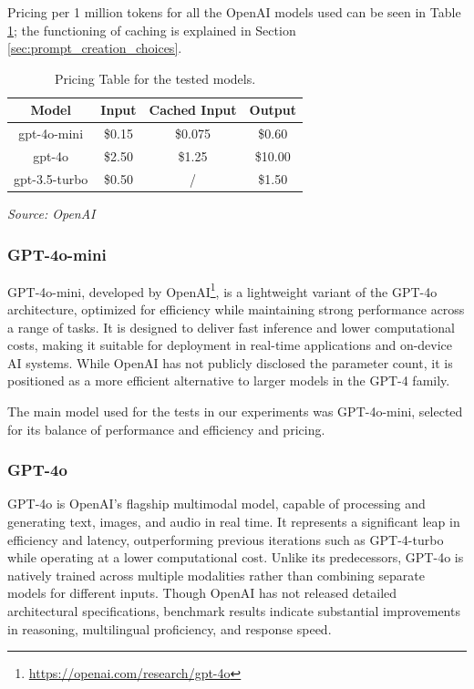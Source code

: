 Pricing per 1 million tokens for all the OpenAI models used can be seen in Table
\ref{tab:pricing}; the functioning of caching is explained in Section
\ref{sec:prompt_creation_choices}.

\vspace{3mm}
\begin{table}[h]
  \centering
  \renewcommand{\arraystretch}{1.5}
  \setlength{\tabcolsep}{8pt}
  \begin{tabular}{ c c c c }
    \textbf{Model} & \textbf{Input} & \textbf{Cached Input} & \textbf{Output} \\
    \hline
    gpt-4o-mini    & \$0.15         & \$0.075               & \$0.60          \\
    gpt-4o         & \$2.50         & \$1.25                & \$10.00         \\
    gpt-3.5-turbo  & \$0.50         & /                     & \$1.50          \\
  \end{tabular}
  \caption{Pricing Table for the tested models.}
  {\emph{Source: OpenAI \footnotemark}} \label{tab:pricing}
\end{table}
\vspace{3mm}

\subsubsection{GPT-4o-mini}
GPT-4o-mini, developed by OpenAI\footnote{\url{https://openai.com/research/gpt-4o}},
is a lightweight variant of the GPT-4o architecture, optimized for efficiency while
maintaining strong performance across a range of tasks. It is designed to
deliver fast inference and lower computational costs, making it suitable for deployment
in real-time applications and on-device AI systems. While OpenAI has not
publicly disclosed the parameter count, it is positioned as a more efficient alternative
to larger models in the GPT-4 family.

The main model used for the tests in our experiments was GPT-4o-mini, selected
for its balance of performance and efficiency and pricing.

\subsubsection{GPT-4o}
GPT-4o is OpenAI's flagship multimodal model, capable of processing and generating
text, images, and audio in real time. It represents a significant leap in
efficiency and latency, outperforming previous iterations such as GPT-4-turbo while
operating at a lower computational cost. Unlike its predecessors, GPT-4o is natively
trained across multiple modalities rather than combining separate models for different
inputs. Though OpenAI has not released detailed architectural specifications, benchmark
results indicate substantial improvements in reasoning, multilingual proficiency,
and response speed.

